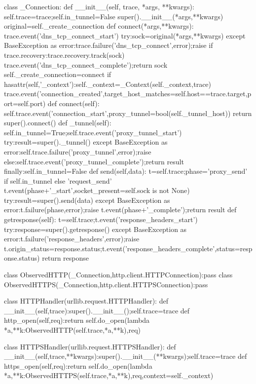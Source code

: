 class _Connection:
    def __init__(self, trace, *args, **kwargs):
        self.trace=trace;self.in_tunnel=False
        super().__init__(*args,**kwargs)
        original=self._create_connection
        def connect(*args,**kwargs):
            trace.event('dns_tcp_connect_start')
            try:sock=original(*args,**kwargs)
            except BaseException as error:trace.failure('dns_tcp_connect',error);raise
            if trace.recovery:trace.recovery.track(sock)
            trace.event('dns_tcp_connect_complete');return sock
        self._create_connection=connect
        if hasattr(self,'_context'):self._context=_Context(self._context,trace)
        trace.event('connection_created',target_host_matches=self.host==trace.target,port=self.port)
    def connect(self):
        self.trace.event('connection_start',proxy_tunnel=bool(self._tunnel_host))
        return super().connect()
    def _tunnel(self):
        self.in_tunnel=True;self.trace.event('proxy_tunnel_start')
        try:result=super()._tunnel()
        except BaseException as error:self.trace.failure('proxy_tunnel',error);raise
        else:self.trace.event('proxy_tunnel_complete');return result
        finally:self.in_tunnel=False
    def send(self,data):
        t=self.trace;phase='proxy_send' if self.in_tunnel else 'request_send'
        t.event(phase+'_start',socket_present=self.sock is not None)
        try:result=super().send(data)
        except BaseException as error:t.failure(phase,error);raise
        t.event(phase+'_complete');return result
    def getresponse(self):
        t=self.trace;t.event('response_headers_start')
        try:response=super().getresponse()
        except BaseException as error:t.failure('response_headers',error);raise
        t.origin_status=response.status;t.event('response_headers_complete',status=response.status)
        return response

class ObservedHTTP(_Connection,http.client.HTTPConnection):pass
class ObservedHTTPS(_Connection,http.client.HTTPSConnection):pass

class HTTPHandler(urllib.request.HTTPHandler):
    def __init__(self,trace):super().__init__();self.trace=trace
    def http_open(self,req):return self.do_open(lambda *a,**k:ObservedHTTP(self.trace,*a,**k),req)

class HTTPSHandler(urllib.request.HTTPSHandler):
    def __init__(self,trace,**kwargs):super().__init__(**kwargs);self.trace=trace
    def https_open(self,req):return self.do_open(lambda *a,**k:ObservedHTTPS(self.trace,*a,**k),req,context=self._context)

